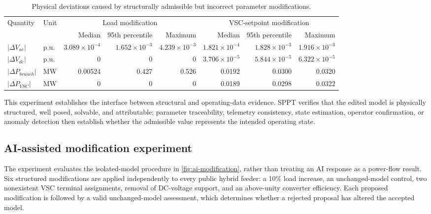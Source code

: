 \begin{table}[t]
\centering
\caption{Physical deviations caused by structurally admissible but incorrect
parameter modifications.}
\label{tab:intent-impact}
\footnotesize
\begin{tabularx}{\textwidth}{@{}Xlrrrrrr@{}}
\toprule
Quantity & Unit & \multicolumn{3}{c}{Load modification} & \multicolumn{3}{c}{VSC-setpoint modification}\\
\cmidrule(lr){3-5}\cmidrule(lr){6-8}
& & Median & 95th percentile & Maximum & Median & 95th percentile & Maximum\\
\midrule
$|\Delta V_{ac}|$ & p.u. & $3.089\!\times\!10^{-4}$ & $1.652\!\times\!10^{-3}$ & $4.239\!\times\!10^{-3}$ & $1.821\!\times\!10^{-4}$ & $1.828\!\times\!10^{-3}$ & $1.916\!\times\!10^{-3}$\\
$|\Delta V_{dc}|$ & p.u. & 0 & 0 & 0 & $3.706\!\times\!10^{-5}$ & $5.844\!\times\!10^{-5}$ & $6.322\!\times\!10^{-5}$\\
$|\Delta P_{branch}|$ & MW & 0.00524 & 0.427 & 0.526 & 0.0192 & 0.0300 & 0.0320\\
$|\Delta P_{VSC}|$ & MW & 0 & 0 & 0 & 0.0189 & 0.0298 & 0.0322\\
\bottomrule
\end{tabularx}
\end{table}

This experiment establishes the interface between structural and operating-data
evidence. SPPT verifies that the edited model is physically structured, well
posed, solvable, and attributable; parameter traceability, telemetry
consistency, state estimation, operator confirmation, or anomaly detection then
establish whether the admissible value represents the intended operating state.

\subsection{AI-assisted modification experiment}

The experiment evaluates the isolated-model procedure in
\cref{fig:ai-modification}, rather than treating an AI response as a power-flow
result. Six structured modifications are applied independently to every public
hybrid feeder: a 10\% load increase, an unchanged-model control, two nonexistent
VSC terminal assignments, removal of DC-voltage support, and an above-unity
converter efficiency. Each proposed modification is followed by a valid
unchanged-model assessment, which determines whether a rejected proposal has
altered the accepted model.

